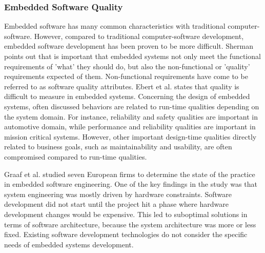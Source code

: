 \subsubsection{Embedded Software Quality}
Embedded software has many common characteristics with traditional computer-software. However, compared to traditional computer-software development, embedded software development has been proven to be more difficult\cite{ebert2009embedded,sherman2008quality}. Sherman\cite{sherman2008quality} points out that is important that embedded systems not only meet the functional requirements of 'what' they should do, but also the non-functional or 'quality' requirements expected of them. Non-functional requirements have come to be referred to as software quality attributes. Ebert et al.\cite{ebert2009embedded} states that quality is difficult to measure in embedded systems. Concerning the design of embedded systems, often discussed behaviors are related to run-time qualities depending on the system domain. For instance, reliability and safety qualities are important in automotive domain\cite{pretschner2007software}, while performance and reliability qualities are important in mission critical systems\cite{trienekens2010quality}. However, other important design-time qualities directly related to business goals, such as maintainability and usability, are often compromised compared to run-time qualities. 

Graaf et al.\cite{graaf2003embedded} studied seven European firms to determine the state of the practice in embedded software engineering. One of the key findings in the study was that system engineering was mostly driven by hardware constraints. Software development did not start until the project hit a phase where hardware development changes would be expensive. This led to suboptimal solutions in terms of software architecture, because the system architecture was more or less fixed. Existing software development technologies do not consider the specific needs of embedded systems development.









